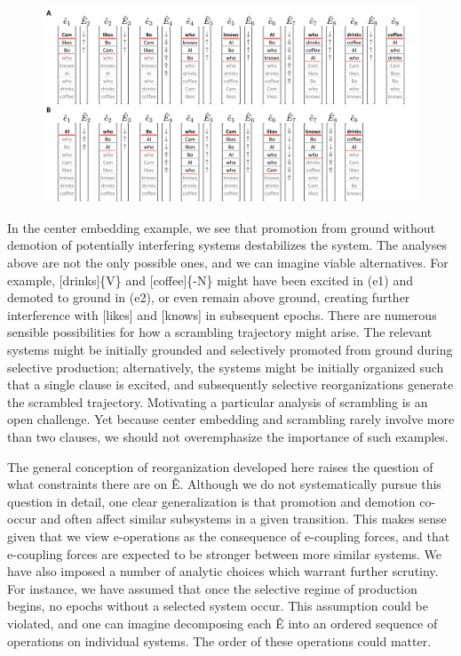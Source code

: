  
\begin{figure}
\includegraphics[width=\textwidth]{figures/Tilsen-img119.png}
\caption{\missingcaption}
\label{fig:}
\end{figure}
 

  In the center embedding example, we see that promotion from ground without demotion of potentially interfering systems destabilizes the system. The analyses above are not the only possible ones, and we can imagine viable alternatives. For example, [drinks]\{V\} and [coffee]\{-N\} might have been excited in (e1) and demoted to ground in (e2), or even remain above ground, creating further interference with [likes] and [knows] in subsequent epochs. There are numerous sensible possibilities for how a scrambling trajectory might arise. The relevant systems might be initially grounded and selectively promoted from ground during selective production; alternatively, the systems might be initially organized such that a single clause is excited, and subsequently selective reorganizations generate the scrambled trajectory. Motivating a particular analysis of scrambling is an open challenge. Yet because center embedding and scrambling rarely involve more than two clauses, we should not overemphasize the importance of such examples.

  The general conception of reorganization developed here raises the question of what constraints there are on Ê. Although we do not systematically pursue this question in detail, one clear generalization is that promotion and demotion co-occur and often affect similar subsystems in a given transition. This makes sense given that we view e-operations as the consequence of e-coupling forces, and that e-coupling forces are expected to be stronger between more similar systems. We have also imposed a number of analytic choices which warrant further scrutiny. For instance, we have assumed that once the selective regime of production begins, no epochs without a selected system occur. This assumption could be violated, and one can imagine decomposing each Ê into an ordered sequence of operations on individual systems. The order of these operations could matter.

